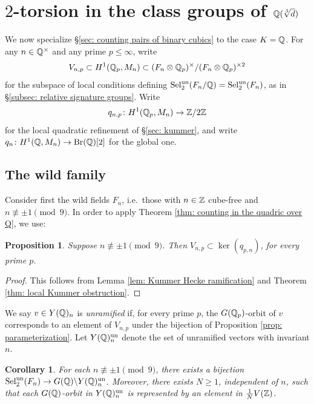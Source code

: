 \documentclass[11pt,a4paper]{amsart}
\def\Z{{\rm \mathbb{Z}}}
\def\Q{{\rm \mathbb{Q}}}
\def\un{{\rm un}}
\def\Br{{\rm Br}}
\def\Sel{{\rm Sel}}
\numberwithin{equation}{section}
\newtheorem{corollary}[theorem]{Corollary}
\newtheorem{proposition}[theorem]{Proposition}
\begin{document}
\section{$2$-torsion in the class groups of  $\Q(\sqrt[3]{d})$}

We now specialize \S\ref{sec: counting pairs of binary cubics} to the case $K = \Q$. For any $n \in \Q^\times$ and any prime $p \leq \infty$, write 
\[V_{n,p} \subset H^1(\Q_p,M_n) \subset (F_n \otimes \Q_p)^\times/(F_n \otimes \Q_p)^{\times 2}\] 
for the subspace of local conditions defining $\Sel_2^\un(F_n/\Q) = \Sel_2^\un(F_n)$, as in \S\ref{subsec: relative signature groups}. Write
\[q_{n,p} \colon H^1(\Q_p, M_n) \to \Z/2\Z\] 
for the local quadratic refinement of \S\ref{sec: kummer}, and write $q_n \colon H^1(\Q, M_n) \to \Br(\Q)[2]$ for the global one. 

\subsection{The wild family}
Consider first the wild fields $F_n$, i.e.\ those with $n \in \Z$ cube-free and $n \not \equiv \pm 1\pmod{9}$.  In order to apply Theorem \ref{thm: counting in the quadric over Q}, we use: 

\begin{proposition}\label{prop: local signature elements are unobstructed}
Suppose $n \not\equiv \pm 1 \pmod{9}$. Then $V_{n,p} \subset \ker(q_{p,n})$, for every prime $p$.
\end{proposition}
\begin{proof}
This follows from Lemma \ref{lem: Kummer Hecke ramification} and Theorem \ref{thm: local Kummer obstruction}.  
\end{proof}

We say  $v \in Y(\Q)_n$ is {\it unramified} if, for every prime $p$, the $G(\Q_p)$-orbit of $v$ corresponds to an element of $V_{n,p}$ under the bijection of Proposition \ref{prop: parameterization}. Let $Y(\Q)_n^\un$ denote the set of unramified vectors with invariant $n$. 

\begin{corollary}\label{cor: Z bijection wild}
For each $n \not\equiv \pm 1\pmod{9}$, there exists a bijection $\Sel_2^\un(F_n) \to G(\Q)\backslash Y(\Q)^\un_n$. Moreover, there exists $N \geq 1$,  independent of $n$, such that each $G(\Q)$-orbit in $Y(\Q)^\un_n$ is represented by an element in $\frac{1}{N}V(\Z)$. 
\end{corollary}
\end{document}
